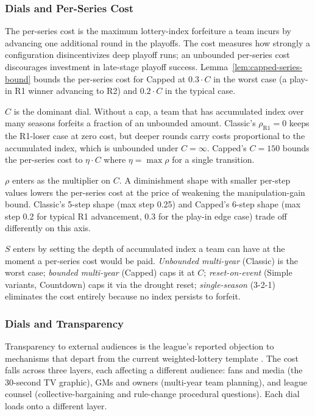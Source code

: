 \subsubsection{Dials and Per-Series Cost}
\label{sec:dial-cost}

The per-series cost is the maximum lottery-index forfeiture a team incurs by advancing one additional round in the playoffs. The cost measures how strongly a configuration disincentivizes deep playoff runs; an unbounded per-series cost discourages investment in late-stage playoff success. Lemma~\ref{lem:capped-series-bound} bounds the per-series cost for Capped at $0.3 \cdot C$ in the worst case (a play-in R1 winner advancing to R2) and $0.2 \cdot C$ in the typical case.

$C$ is the dominant dial. Without a cap, a team that has accumulated index over many seasons forfeits a fraction of an unbounded amount. Classic's $\rho_{\text{R1}} = 0$ keeps the R1-loser case at zero cost, but deeper rounds carry costs proportional to the accumulated index, which is unbounded under $C = \infty$. Capped's $C = 150$ bounds the per-series cost to $\eta \cdot C$ where $\eta = \max \rho$ for a single transition.

$\rho$ enters as the multiplier on $C$. A diminishment shape with smaller per-step values lowers the per-series cost at the price of weakening the manipulation-gain bound. Classic's 5-step shape (max step 0.25) and Capped's 6-step shape (max step 0.2 for typical R1 advancement, 0.3 for the play-in edge case) trade off differently on this axis.

$S$ enters by setting the depth of accumulated index a team can have at the moment a per-series cost would be paid. \emph{Unbounded multi-year} (Classic) is the worst case; \emph{bounded multi-year} (Capped) caps it at $C$; \emph{reset-on-event} (Simple variants, Countdown) caps it via the drought reset; \emph{single-season} (3-2-1) eliminates the cost entirely because no index persists to forfeit.

\subsubsection{Dials and Transparency}
\label{sec:dial-transparency}

Transparency to external audiences is the league's reported objection to mechanisms that depart from the current weighted-lottery template \citep{highley2026solvable5}. The cost falls across three layers, each affecting a different audience: fans and media (the 30-second TV graphic), GMs and owners (multi-year team planning), and league counsel (collective-bargaining and rule-change procedural questions). Each dial loads onto a different layer.

